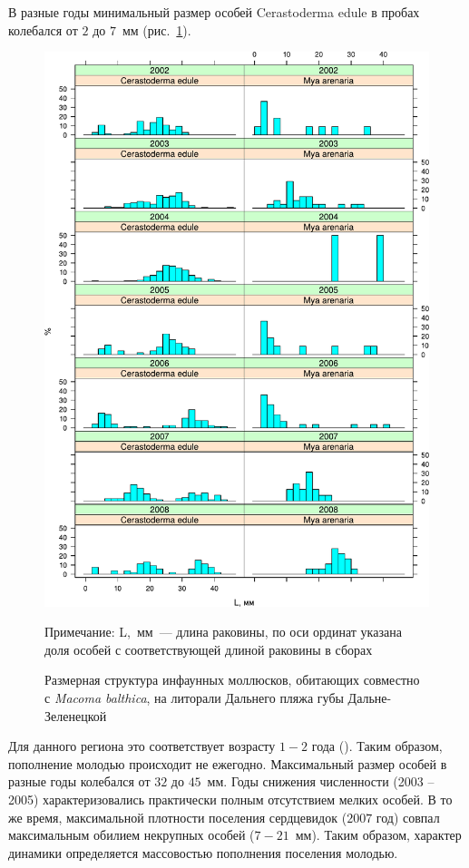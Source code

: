 В разные годы минимальный размер особей Cerastoderma edule в пробах колебался от $2$ до $7$~мм (рис.~\ref{ris:DZ_size_str_bivalve}). 
%
	\begin{figure}[p]
		\includegraphics[height=.9\textheight]{../after_Deryuginskie/2_disser/size_structure_Cerastoderma_Mya_2mmclass1.pdf}
\caption{Размерная структура инфаунных моллюсков, обитающих совместно с {\it Macoma balthica}, на литорали Дальнего пляжа губы Дальне-Зеленецкой}
\label{ris:DZ_size_str_bivalve}

{\footnotesize Примечание: L,~мм~--- длина раковины, по оси ординат указана доля особей с соответствующей длиной раковины в сборах}
\end{figure}
%
Для данного региона это соответствует возрасту $1-2$ года (\cite{Genelt-Yanovskiy_et_al_2010}). 
Таким образом, пополнение молодью происходит не ежегодно. 
Максимальный размер особей в разные годы колебался от $32$ до $45$~мм. 
Годы снижения численности (2003 -- 2005) характеризовались практически полным отсутствием мелких особей. 
В то же время, максимальной плотности поселения сердцевидок ($2007$ год) совпал максимальным обилием некрупных особей ($7 - 21$~мм). 
Таким образом, характер динамики определяется массовостью пополнения поселения молодью.

